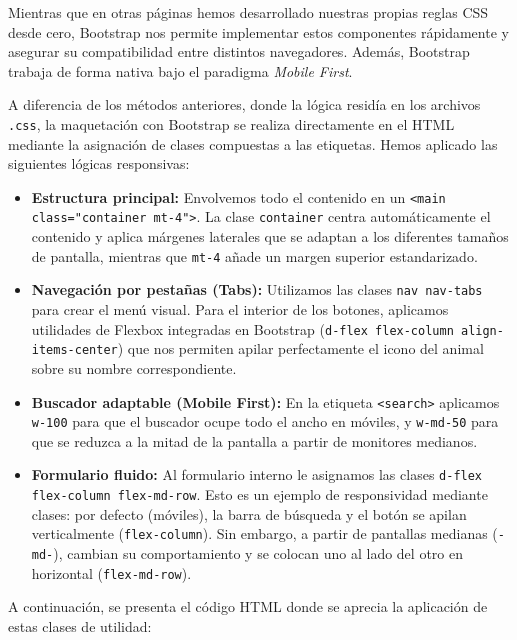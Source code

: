 \documentclass[11pt]{article}
\begin{document}
Mientras que en otras páginas hemos desarrollado nuestras propias reglas CSS desde cero, Bootstrap nos permite implementar estos componentes rápidamente y asegurar su compatibilidad entre distintos navegadores. Además, Bootstrap trabaja de forma nativa bajo el paradigma \textit{Mobile First}.

A diferencia de los métodos anteriores, donde la lógica residía en los archivos \texttt{.css}, la maquetación con Bootstrap se realiza directamente en el HTML mediante la asignación de clases compuestas a las etiquetas. Hemos aplicado las siguientes lógicas responsivas:

\begin{itemize}
\item \textbf{Estructura principal:} Envolvemos todo el contenido en un \texttt{<main class="container mt-4">}. La clase \texttt{container} centra automáticamente el contenido y aplica márgenes laterales que se adaptan a los diferentes tamaños de pantalla, mientras que \texttt{mt-4} añade un margen superior estandarizado.
\item \textbf{Navegación por pestañas (Tabs):} Utilizamos las clases \texttt{nav nav-tabs} para crear el menú visual. Para el interior de los botones, aplicamos utilidades de Flexbox integradas en Bootstrap (\texttt{d-flex flex-column align-items-center}) que nos permiten apilar perfectamente el icono del animal sobre su nombre correspondiente.
\item \textbf{Buscador adaptable (Mobile First):} En la etiqueta \texttt{<search>} aplicamos \texttt{w-100} para que el buscador ocupe todo el ancho en móviles, y \texttt{w-md-50} para que se reduzca a la mitad de la pantalla a partir de monitores medianos.
\item \textbf{Formulario fluido:} Al formulario interno le asignamos las clases \texttt{d-flex flex-column flex-md-row}. Esto es un ejemplo de responsividad mediante clases: por defecto (móviles), la barra de búsqueda y el botón se apilan verticalmente (\texttt{flex-column}). Sin embargo, a partir de pantallas medianas (\texttt{-md-}), cambian su comportamiento y se colocan uno al lado del otro en horizontal (\texttt{flex-md-row}).
\end{itemize}

A continuación, se presenta el código HTML donde se aprecia la aplicación de estas clases de utilidad:
\end{document}
